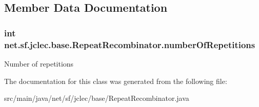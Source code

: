\subsection{Member Data Documentation}
\hypertarget{classnet_1_1sf_1_1jclec_1_1base_1_1_repeat_recombinator_a045a86444b6cb91ac1fdecba2cb0a2c0}{
\subsubsection[{number\-Of\-Repetitions}]{\setlength{\rightskip}{0pt plus 5cm}int net.\-sf.\-jclec.\-base.\-Repeat\-Recombinator.\-number\-Of\-Repetitions\hspace{0.3cm}{\ttfamily [protected]}}}\label{classnet_1_1sf_1_1jclec_1_1base_1_1_repeat_recombinator_a045a86444b6cb91ac1fdecba2cb0a2c0}
Number of repetitions 

The documentation for this class was generated from the following file\-:\begin{DoxyCompactItemize}
\item 
src/main/java/net/sf/jclec/base/Repeat\-Recombinator.\-java\end{DoxyCompactItemize}
